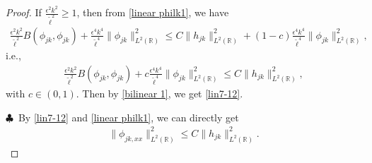 \documentclass[10pt,a4paper]{amsart}
\begin{document}
\begin{proof}
\noindent If $ \frac{\epsilon^2k^2}{{\tilde\ell}^2} \geq 1$, then from \eqref{linear philk1}, we have
\begin{align*}
 \frac{\epsilon^2k^2}{{\tilde\ell}^2} B(\phi_{jk}, \phi_{jk}) + \frac{\epsilon^4k^4}{{\tilde\ell}^4} \|\phi_{jk}\|^2_{L^2({\mathbb R})} \leq C\|h_{jk}\|^2_{L^2({\mathbb R})} + (1-c)\frac{\epsilon^4k^4}{{\tilde\ell}^4} \|\phi_{jk}\|^2_{L^2({\mathbb R})},
\end{align*}
 i.e.,
\begin{align*}
 \frac{\epsilon^2k^2}{{\tilde\ell}^2} B(\phi_{jk}, \phi_{jk}) + c\frac{\epsilon^4k^4}{{\tilde\ell}^4} \|\phi_{jk}\|^2_{L^2({\mathbb R})} \leq C\|h_{jk}\|^2_{L^2({\mathbb R})},
\end{align*}
with $c\in (0, 1)$.
 Then by \eqref{bilinear 1}, we get \eqref{lin7-12}.

\smallskip\noindent$\clubsuit$\
By \eqref{lin7-12} and \eqref{linear philk1}, we can directly get
\begin{align}\label{second order estiamte}
\|\phi_{jk, xx}\|^2_{L^2({\mathbb R})} \leq C\|h_{jk}\|^2_{L^2({\mathbb R})}.
\end{align}



\end{proof}
\end{document}
